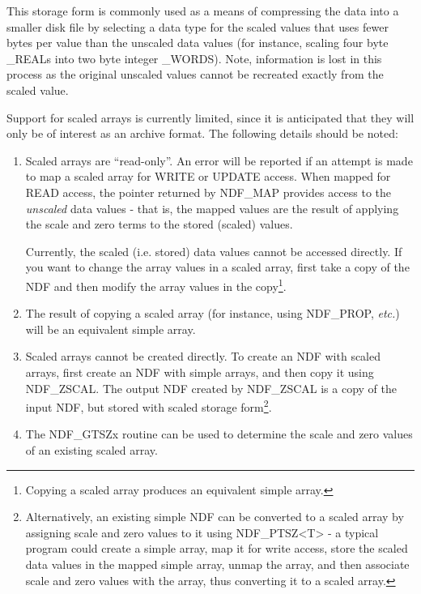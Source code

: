 \documentclass[twoside,11pt,nolof]{starlink}
\begin{document}
This storage form is commonly used as a means of compressing the data
into a smaller disk file by selecting a data type for the scaled values
that uses fewer bytes per value than the unscaled data values (for
instance, scaling four byte \_REALs into two byte integer \_WORDS). Note,
information is lost in this process as the original unscaled values
cannot be recreated exactly from the scaled value.

Support for scaled arrays is currently limited, since it is anticipated
that they will only be of interest as an archive format. The following
details should be noted:

\begin{enumerate}

\item Scaled arrays are ``read-only''. An error will be reported if an
attempt is made to map a scaled array for WRITE or UPDATE access. When
mapped for READ access, the pointer returned by NDF\_MAP provides access
to the \emph{unscaled} data values - that is, the mapped values are the
result of applying the scale and zero terms to the stored (scaled) values.

Currently, the scaled (i.e. stored) data values cannot be accessed
directly. If you want to change the array values in a scaled array, first
take a copy of the NDF and then modify the array values in the
copy\footnote{Copying a scaled array produces an equivalent simple
array.}.

\item The result of copying a scaled array (for instance, using
NDF\_PROP, \emph{etc.}) will be an equivalent simple array.

\item Scaled arrays cannot be created directly. To create an NDF with
scaled arrays, first create an NDF with simple arrays, and then copy it
using NDF\_ZSCAL. The output NDF created by NDF\_ZSCAL is a copy
of the input NDF, but stored with scaled storage form\footnote{Alternatively,
an existing simple NDF can be converted to a scaled array by assigning
scale and zero values to it using NDF\_PTSZ<T> - a typical program
could create a simple array, map it for write access, store the scaled
data values in the mapped simple array, unmap the array, and then
associate scale and zero values with the array, thus converting it to a
scaled array.}.

\item The NDF\_GTSZx routine can be used to determine the scale and zero
values of an existing scaled array.


\end{enumerate}
\end{document}
